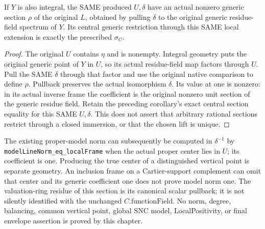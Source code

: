 \begin{corollary}
\label{cor:central-generic-prescribed-section-same-rational-lift}
\leanok
If $Y$ is also integral, the SAME produced $U,\delta$ have an actual
nonzero generic section $\rho$ of the original $L$, obtained by pulling
$\delta$ to the original generic residue-field spectrum of $Y$.
Its central generic restriction through this SAME local extension is
exactly the prescribed $\sigma_C$.
\end{corollary}
\begin{proof}
The original $U$ contains $\eta$ and is nonempty.  Integral geometry puts
the original generic point of $Y$ in $U$, so its actual residue-field
map factors through $U$.  Pull the SAME $\delta$ through that factor
and use the original native comparison to define $\rho$.  Pullback
preserves the actual isomorphism $\delta$.  Its value at one is nonzero:
in its actual inverse frame the coefficient is the original nonzero
unit section of the generic residue field.  Retain the preceding
corollary's exact central section equality for this SAME $U,\delta$.
This does not assert that arbitrary rational sections restrict through
a closed immersion, or that the chosen lift is unique.
\end{proof}

The existing proper-model norm can subsequently be computed in
$\delta^{-1}$ by \texttt{modelLineNorm\_eq\_localFrame} when the actual
proper center lies in $U$; its coefficient is one.  Producing the true
center of a distinguished vertical point is separate geometry.  An
inclusion frame on a Cartier-support complement can omit that center
and its generic coefficient one does not prove model norm one.
The valuation-ring residue of this section is its canonical scalar
pullback; it is not silently identified with the unchanged
$C.\mathrm{functionField}$.  No norm, degree, balancing, common vertical
point, global SNC model, LocalPositivity, or final envelope assertion
is proved by this chapter.
